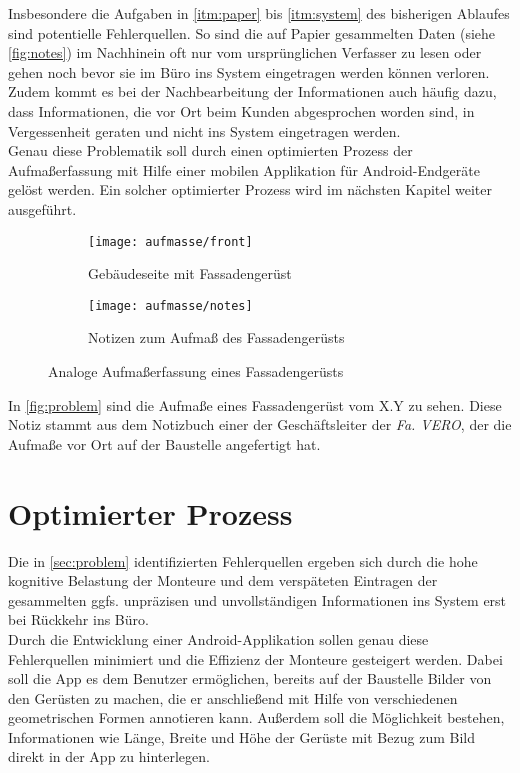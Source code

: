 Insbesondere die Aufgaben in \autoref{itm:paper} bis \autoref{itm:system} des bisherigen Ablaufes sind potentielle Fehlerquellen.
So sind die auf Papier gesammelten Daten (siehe \autoref{fig:notes}) im Nachhinein oft nur vom ursprünglichen Verfasser zu lesen oder gehen noch bevor sie im Büro ins System eingetragen werden können verloren.
Zudem kommt es bei der Nachbearbeitung der Informationen auch häufig dazu, dass Informationen, die vor Ort beim Kunden abgesprochen worden sind, in Vergessenheit geraten und nicht ins System eingetragen werden. \\

Genau diese Problematik soll durch einen optimierten Prozess der Aufmaßerfassung mit Hilfe einer mobilen Applikation für Android-Endgeräte gelöst werden.
Ein solcher optimierter Prozess wird im nächsten Kapitel weiter ausgeführt.

\begin{figure}[h]
  \centering
  \begin{subfigure}[t]{0.4\textwidth}
    \texttt{[image: aufmasse/front]}
    \caption{Gebäudeseite mit Fassadengerüst}
  \end{subfigure}
  \begin{subfigure}[t]{0.4\textwidth}
    \texttt{[image: aufmasse/notes]}
    \caption{Notizen zum Aufmaß des Fassadengerüsts}
    \label{fig:notes}
  \end{subfigure}
  \caption{Analoge Aufmaßerfassung eines Fassadengerüsts}
  \label{fig:problem}
\end{figure}

In \autoref{fig:problem} sind die Aufmaße eines Fassadengerüst vom X.Y zu sehen.
Diese Notiz stammt aus dem Notizbuch einer der Geschäftsleiter der \emph{Fa. VERO}, der die Aufmaße vor Ort auf der Baustelle angefertigt hat.

\section{Optimierter Prozess}
Die in \autoref{sec:problem} identifizierten Fehlerquellen ergeben sich durch die hohe kognitive Belastung der Monteure und dem verspäteten Eintragen der gesammelten ggfs. unpräzisen und unvollständigen Informationen ins System erst bei Rückkehr ins Büro. \\

Durch die Entwicklung einer Android-Applikation sollen genau diese Fehlerquellen minimiert und die Effizienz der Monteure gesteigert werden.
Dabei soll die App es dem Benutzer ermöglichen, bereits auf der Baustelle Bilder von den Gerüsten zu machen, die er anschließend mit Hilfe von verschiedenen geometrischen Formen annotieren kann.
Außerdem soll die Möglichkeit bestehen, Informationen wie Länge, Breite und Höhe der Gerüste mit Bezug zum Bild direkt in der App zu hinterlegen. \\

